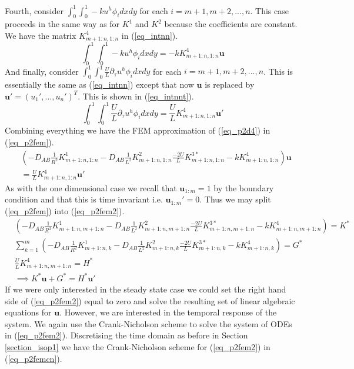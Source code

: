 \documentclass[11pt,fleqn]{article}
\theoremstyle{defstyle}
\begin{document}
Fourth, consider $\int_0^1 \int_0^1  - ku^h \phi_i dxdy$ for each $i=m+1, m+2,...,n$. This case proceeds in the same way as for $K^1$ and $K^2$ because the coefficients are constant. We have the matrix $K^4_{m+1:n, 1:n}$ in (\ref{eq_intnn}).
\begin{equation}
\int_0^1 \int_0^1 - ku^h \phi_i dxdy = -kK^4_{m+1:n, 1:n}\mathbf{u}
\label{eq_intnn}
\end{equation}
And finally, consider $\int_0^1 \int_0^1 \frac{U}{L} \partial_\tau u^h \phi_i dxdy$ for each $i=m+1, m+2,...,n$. This is essentially the same as (\ref{eq_intnn}) except that now $\mathbf{u}$ is replaced by $\mathbf{u} \prime = \left( u_1 \prime,...,u_n \prime\right)^T$. This is shown in (\ref{eq_intnnt}).
\begin{equation}
\int_0^1 \int_0^1 \frac{U}{L} \partial_\tau u^h \phi_i dxdy = \frac{U}{L} K^4_{m+1:n, 1:n}\mathbf{u}\prime
\label{eq_intnnt}
\end{equation}
Combining everything we have the FEM approximation of (\ref{eq_p2d4}) in (\ref{eq_p2fem}).
\begin{equation}
\begin{aligned}
&\left( -D_{AB}\frac{1}{R^2}K^1_{m+1:n, 1:n} -D_{AB}\frac{1}{L^2}K^2_{m+1:n, 1:n} \frac{-2U}{L} K^{3*}_{m+1:n,1:n} -kK^4_{m+1:n, 1:n} \right)\mathbf{u} \\ &=\frac{U}{L} K^4_{m+1:n, 1:n}\mathbf{u}\prime
\end{aligned}
\label{eq_p2fem}
\end{equation}
As with the one dimensional case we recall that $\mathbf{u}_{1:m}=1$ by the boundary condition and that this is time invariant i.e. $\mathbf{u}_{1:m}\prime=0$. Thus we may split (\ref{eq_p2fem}) into (\ref{eq_p2fem2}).
\begin{equation}
\begin{aligned}
&\left( -D_{AB}\frac{1}{R^2}K^1_{m+1:n, m+1:n} -D_{AB}\frac{1}{L^2}K^2_{m+1:n, m+1:n} \frac{-2U}{L} K^{3*}_{m+1:n,m+1:n} -kK^4_{m+1:n, m+1:n} \right) = K^* \\
&\sum_{k=1}^m \left(-D_{AB}\frac{1}{R^2}K^1_{m+1:n, k} -D_{AB}\frac{1}{L^2}K^2_{m+1:n, k} \frac{-2U}{L} K^{3*}_{m+1:n,k} -kK^4_{m+1:n,k} \right) = G^* \\
&\frac{U}{L} K^4_{m+1:n, m+1:n} = H^* \\
&\implies K^*\mathbf{u} + G^* = H^*\mathbf{u}\prime
\end{aligned}
\label{eq_p2fem2}
\end{equation}
If we were only interested in the steady state case we could set the right hand side of (\ref{eq_p2fem2}) equal to zero and solve the resulting set of linear algebraic equations for $\mathbf{u}$. However, we are interested in the temporal response of the system. We again use the Crank-Nicholson scheme to solve the system of ODEs in (\ref{eq_p2fem2}). Discretising the time domain as before in Section \ref{section_isop1} we have the Crank-Nicholson scheme for (\ref{eq_p2fem2}) in (\ref{eq_p2femcn}).
\end{document}
